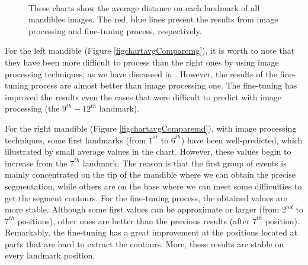 \documentclass[review]{elsarticle}
\begin{document}
\begin{figure}[h!]
    \centering
    ~~
    \caption{These charts show the average distance on each landmark of all mandibles images. The red, blue lines present the results from image processing and fine-tuning process, respectively.}
    \label{figchartavgCompare}
\end{figure}

For the left mandible (Figure \ref{figchartavgComparemg}), it is worth to note that they have been more difficult to process than the right ones by using image processing techniques, as we have discussed in \cite{le2017maelab}. However, the results of the fine-tuning process are almost better than image processing one. The fine-tuning has improved the results even the cases that were difficult to predict with image processing (the $9^{th} - 12^{th}$ landmark).

For the right mandible (Figure \ref{figchartavgComparemd}), with image processing techniques, some first landmarks (from $1^{st}$ to $6^{th}$) have been well-predicted, which illustrated by small average values in the chart. However, these values begin to increase from the $7^{th}$ landmark. The reason is that the first group of events is mainly concentrated on the tip of the mandible
where we can obtain the precise segmentation, while others are on the base where we can meet some difficulties to get the segment contours. For the fine-tuning process, the obtained values are more stable. Although some first values can be approximate or larger (from $2^{nd}$ to $7^{th}$ positions), other ones are better than the previous results (after $7^{th}$ position). Remarkably, the fine-tuning has a great improvement at the positions located at parts that are hard to extract the contours. More, these results are stable on every landmark position. 
\end{document}
